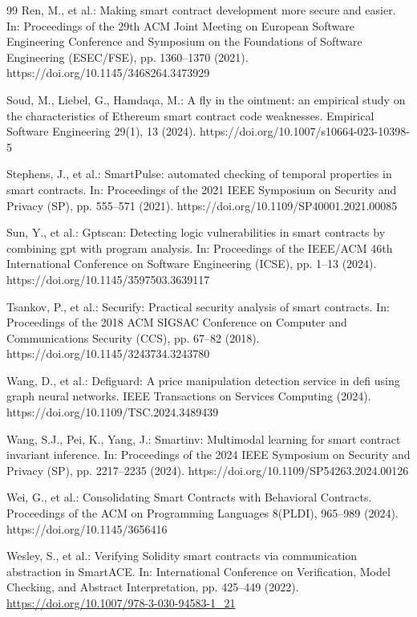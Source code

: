 \documentclass[pdflatex,sn-basic]{sn-jnl}%
\theoremstyle{thmstyleone}%
\theoremstyle{thmstyletwo}%
\theoremstyle{thmstylethree}%
\begin{document}
\begin{thebibliography}{99}
Ren, M., et al.: Making smart contract development more secure and easier. In: Proceedings of the 29th ACM Joint Meeting on European Software Engineering Conference and Symposium on the Foundations of Software Engineering (ESEC/FSE), pp. 1360--1370 (2021). https://doi.org/10.1145/3468264.3473929

Soud, M., Liebel, G., Hamdaqa, M.: A fly in the ointment: an empirical study on the characteristics of Ethereum smart contract code weaknesses. Empirical Software Engineering 29(1), 13 (2024). https://doi.org/10.1007/s10664-023-10398-5

Stephens, J., et al.: SmartPulse: automated checking of temporal properties in smart contracts. In: Proceedings of the 2021 IEEE Symposium on Security and Privacy (SP), pp. 555--571 (2021). https://doi.org/10.1109/SP40001.2021.00085

Sun, Y., et al.: Gptscan: Detecting logic vulnerabilities in smart contracts by combining gpt with program analysis. In: Proceedings of the IEEE/ACM 46th International Conference on Software Engineering (ICSE), pp. 1--13 (2024). https://doi.org/10.1145/3597503.3639117

Tsankov, P., et al.: Securify: Practical security analysis of smart contracts. In: Proceedings of the 2018 ACM SIGSAC Conference on Computer and Communications Security (CCS), pp. 67--82 (2018). https://doi.org/10.1145/3243734.3243780

Wang, D., et al.: Defiguard: A price manipulation detection service in defi using graph neural networks. IEEE Transactions on Services Computing (2024). https://doi.org/10.1109/TSC.2024.3489439

Wang, S.J., Pei, K., Yang, J.: Smartinv: Multimodal learning for smart contract invariant inference. In: Proceedings of the 2024 IEEE Symposium on Security and Privacy (SP), pp. 2217--2235 (2024). https://doi.org/10.1109/SP54263.2024.00126

Wei, G., et al.: Consolidating Smart Contracts with Behavioral Contracts. Proceedings of the ACM on Programming Languages 8(PLDI), 965--989 (2024). https://doi.org/10.1145/3656416

Wesley, S., et al.: Verifying Solidity smart contracts via communication abstraction in SmartACE. In: International Conference on Verification, Model Checking, and Abstract Interpretation, pp. 425--449 (2022). \url{https://doi.org/10.1007/978-3-030-94583-1_21}


\end{thebibliography}
\end{document}
